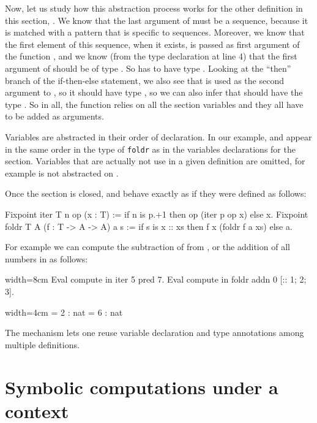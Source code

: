 Now, let us study how this abstraction process works for the other definition
in this section, .  We know that the last argument  of 
must be a sequence, because it is matched with a pattern that is specific
to sequences.  Moreover, we know that the first element of this sequence,
when it exists, is passed as first argument of the function , and
we know (from the type declaration at line 4) that the first argument of
 should be of type .  So  has to have type .
Looking at the ``then'' branch of the if-then-else statement, we also see
that  is used as the second argument to , so it should
have type , so we can also infer that  should have the type .
So in all, the function  relies on all the section variables and
they all have to be added as arguments.

Variables are abstracted in their order of declaration.  In our example,
 and  appear in the same order in the type of {\tt foldr} as
in the variables declarations for the section.  Variables that are actually
not use in a given definition are omitted, for example 
is not abstracted on .

Once the section is closed,  and  behave exactly as
if they were defined as follows:

\begin{coq}{}{}
Fixpoint iter T n op (x : T) :=
  if n is p.+1 then op (iter p op x) else x.
Fixpoint foldr T A (f : T -> A -> A) a s :=
  if s is x :: xs then f x (foldr f a xs) else a.
\end{coq}
For example we can compute the subtraction of  from , or the
addition of all numbers in \C{[:: 1; 2; 3]}
as follows:

\begin{coq}{}{width=8cm}
Eval compute in iter 5 pred 7.
Eval compute in foldr addn 0 [:: 1; 2; 3].
\end{coq}
\begin{coqout}{}{width=4cm}
 = 2 : nat
 = 6 : nat
\end{coqout}

The  mechanism lets one reuse variable declaration and type
annotations among multiple definitions.

\section{Symbolic computations under a context}

